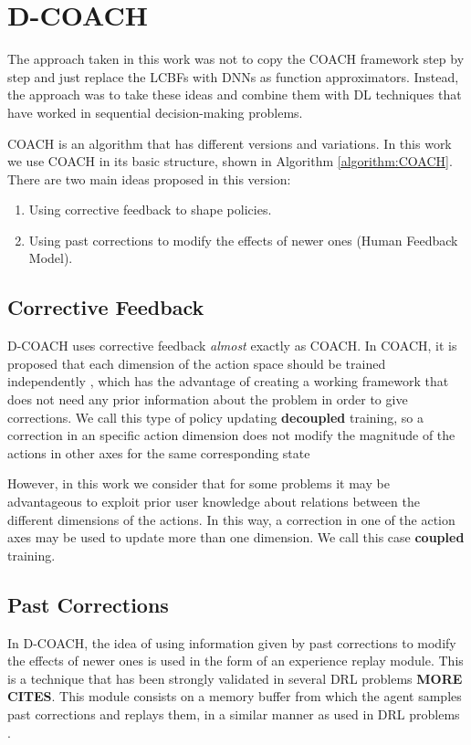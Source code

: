 \section{D-COACH}
The approach taken in this work was not to copy the COACH framework step by step and just replace the LCBFs with DNNs as function approximators. Instead, the approach was to take these ideas and combine them with DL techniques that have worked in sequential decision-making problems. 

COACH is an algorithm that has different versions and variations. In this work we use COACH in its basic structure, shown in Algorithm \ref{algorithm:COACH}. There are two main ideas proposed in this version:

\begin{enumerate}
    \item Using corrective feedback to shape policies.
    \item Using past corrections to modify the effects of newer ones (Human Feedback Model).  
\end{enumerate}

\subsection{Corrective Feedback}
D-COACH uses corrective feedback \emph{almost} exactly as COACH. In COACH, it is proposed that each dimension of the action space should be trained independently \cite{Celemin2017}, which has the advantage of creating a working framework that does not need any prior information about the problem in order to give corrections. We call this type of policy updating \textbf{decoupled} training, so a correction in an specific action dimension does not modify the magnitude of the actions in other axes for the same corresponding state

However, in this work we consider that for some problems it may be advantageous to exploit prior user knowledge about relations between the different dimensions of the actions. In this way, a correction in one of the action axes may be used to update more than one dimension. We call this case \textbf{coupled} training.

\subsection{Past Corrections}
In D-COACH, the idea of using information given by past corrections to modify the effects of newer ones is used in the form of an experience replay module. This is a technique that has been strongly validated in several DRL problems \cite{atari}\textbf{MORE CITES}. This module consists on a memory buffer from which the agent samples past corrections and replays them, in a similar manner as used in DRL problems \cite{atari}.


